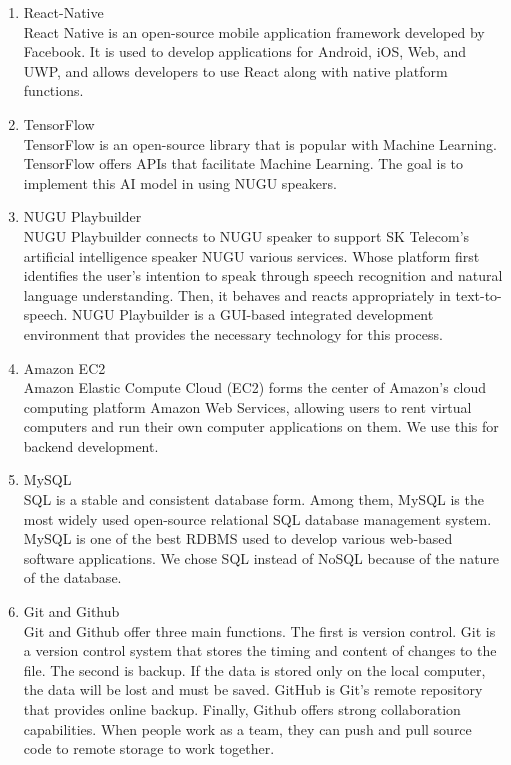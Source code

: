 \documentclass[conference]{IEEEtran}
\begin{document}
\begin{enumerate}
    \begin{enumerate}
        \item React-Native\\
        React Native is an open-source mobile application framework developed by Facebook. It is used to develop applications for Android, iOS, Web, and UWP, and allows developers to use React along with native platform functions.\\
        \item TensorFlow\\
        TensorFlow is an open-source library that is popular with Machine Learning. TensorFlow offers APIs that facilitate Machine Learning. The goal is to implement this AI model in using NUGU speakers.\\
        \item NUGU Playbuilder\\
        NUGU Playbuilder connects to NUGU speaker to support SK Telecom's artificial intelligence speaker NUGU various services. Whose platform first identifies the user's intention to speak through speech recognition and natural language understanding. Then, it behaves and reacts appropriately in text-to-speech. NUGU Playbuilder is a GUI-based integrated development environment that provides the necessary technology for this process.\\
        \item Amazon EC2\\
        Amazon Elastic Compute Cloud (EC2) forms the center of Amazon's cloud computing platform Amazon Web Services, allowing users to rent virtual computers and run their own computer applications on them. We use this for backend development.\\
        \item MySQL\\
        SQL is a stable and consistent database form. Among them, MySQL is the most widely used open-source relational SQL database management system. MySQL is one of the best RDBMS used to develop various web-based software applications. We chose SQL instead of NoSQL because of the nature of the database.\\
        \item Git and Github\\
        Git and Github offer three main functions. The first is version control. Git is a version control system that stores the timing and content of changes to the file. The second is backup. If the data is stored only on the local computer, the data will be lost and must be saved. GitHub is Git's remote repository that provides online backup. Finally, Github offers strong collaboration capabilities. When people work as a team, they can push and pull source code to remote storage to work together.\\

\end{enumerate}
\end{enumerate}
\end{document}
